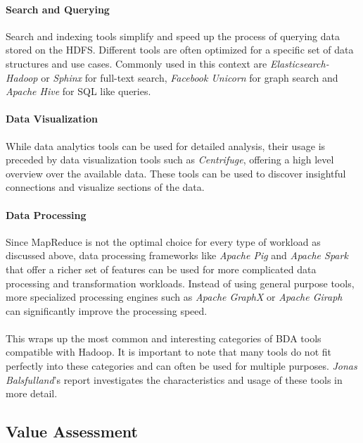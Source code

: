 \paragraph{Search and Querying}
Search and indexing tools simplify and speed up the process of querying data stored on the \ac{HDFS}. Different tools are often optimized for a specific set of data structures and use cases. Commonly used in this context are \emph{Elasticsearch-Hadoop} or \emph{Sphinx} for full-text search, \emph{Facebook Unicorn} for graph search and \emph{Apache Hive} for \ac{SQL} like queries.

\paragraph{Data Visualization}
While data analytics tools can be used for detailed analysis, their usage is preceded by data visualization tools such as \emph{Centrifuge}, offering a high level overview over the available data. These tools can be used to discover insightful connections and visualize sections of the data.

\paragraph{Data Processing}
Since MapReduce is not the optimal choice for every type of workload as discussed above, data processing frameworks like \emph{Apache Pig} and \emph{Apache Spark} that offer a richer set of features can be used for more complicated data processing and transformation workloads. Instead of using general purpose tools, more specialized processing engines such as \emph{Apache GraphX} or \emph{Apache Giraph} can significantly improve the processing speed.

\paragraph{}
This wraps up the most common and interesting categories of \ac{BDA} tools compatible with Hadoop. It is important to note that many tools do not fit perfectly into these categories and can often be used for multiple purposes. \emph{Jonas Balsfulland}'s report investigates the characteristics and usage of these tools in more detail.

\subsection{Value Assessment}
\label{sota-hadoop-assessment}
\label{hadoop-assessment}

